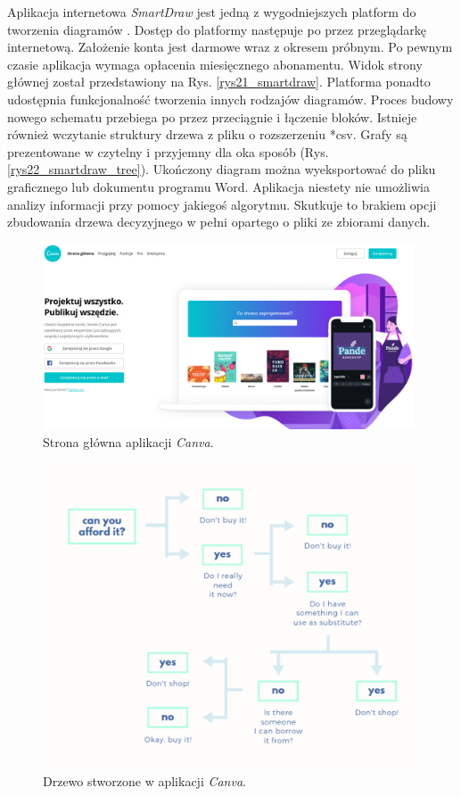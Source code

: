Aplikacja internetowa \textit{SmartDraw} jest jedną z wygodniejszych platform do tworzenia diagramów \cite{misc_smartdraw}. Dostęp do platformy następuje po przez przeglądarkę internetową. Założenie konta jest darmowe wraz z okresem próbnym. Po pewnym czasie aplikacja wymaga opłacenia miesięcznego abonamentu. Widok strony głównej został przedstawiony na Rys. \ref{rys21_smartdraw}. Platforma ponadto udostępnia funkcjonalność tworzenia innych rodzajów diagramów. Proces budowy nowego schematu przebiega po przez przeciągnie i łączenie bloków. Istnieje również wczytanie struktury drzewa z pliku o rozszerzeniu *csv. Grafy są prezentowane w czytelny i przyjemny dla oka sposób (Rys. \ref{rys22_smartdraw_tree}). Ukończony diagram można wyeksportować do pliku graficznego lub dokumentu programu Word. Aplikacja niestety nie umożliwia analizy informacji przy pomocy jakiegoś algorytmu. Skutkuje to brakiem opcji zbudowania drzewa decyzyjnego w pełni opartego o pliki ze zbiorami danych. 

\begin{figure}[htb]
	\centering
	\includegraphics[width=11cm]{grafika/canva.eps}
	\caption{Strona główna aplikacji \textit{Canva}.}
	\label{rys23_canva}
\end{figure}

\begin{figure}[htb]
	\centering
	\includegraphics[width=11cm]{grafika/canvas_tree.eps}
	\caption{Drzewo stworzone w aplikacji \textit{Canva}.}
	\label{rys24_canva_tree}
\end{figure}

